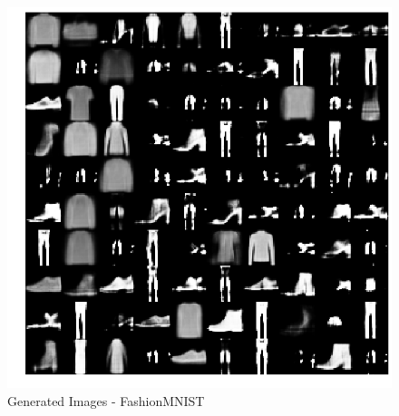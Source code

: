 \documentclass[11pt]{article}
\begin{document}
\begin{figure}
\centering
\includegraphics[width=\textwidth]{fashion.png}
\caption{\label{fig:fashion} Generated Images - FashionMNIST}
\end{figure}
\end{document}
